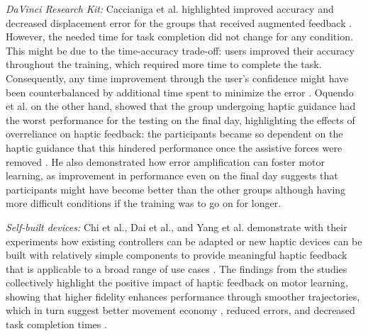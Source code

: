 \textit{DaVinci Research Kit:}
Caccianiga et al. highlighted improved accuracy and decreased displacement error for the groups that received augmented feedback \cite{Caccianiga2021}. However, the needed time for task completion did not change for any condition. This might be due to the time-accuracy trade-off: users improved their accuracy throughout the training, which required more time to complete the task. Consequently, any time improvement through the user's confidence might have been counterbalanced by additional time spent to minimize the error \cite{Caccianiga2021}. 
Oquendo et al. on the other hand, showed that the group undergoing haptic guidance had the worst performance for the testing on the final day, highlighting the effects of overreliance on haptic feedback: the participants became so dependent on the haptic guidance that this hindered performance once the assistive forces were removed \cite{Oquendo2024}. He also demonstrated how error amplification can foster motor learning, as improvement in performance even on the final day suggests that participants might have become better than the other groups although having more difficult conditions if the training was to go on for longer.


\textit{Self-built devices:} Chi et al., Dai et al., and Yang et al. demonstrate with their experiments how existing controllers can be adapted or new haptic devices can be built with relatively simple components to provide meaningful haptic feedback that is applicable to a broad range of use cases \cite{Chi2017, Dai2023, Yang2023}. The findings from the studies collectively highlight the positive impact of haptic feedback on motor learning, showing that higher fidelity enhances performance through smoother trajectories, which in turn suggest better movement economy \cite{Chi2017}, reduced errors, and decreased task completion times \cite{Dai2023, Yang2023}. 

